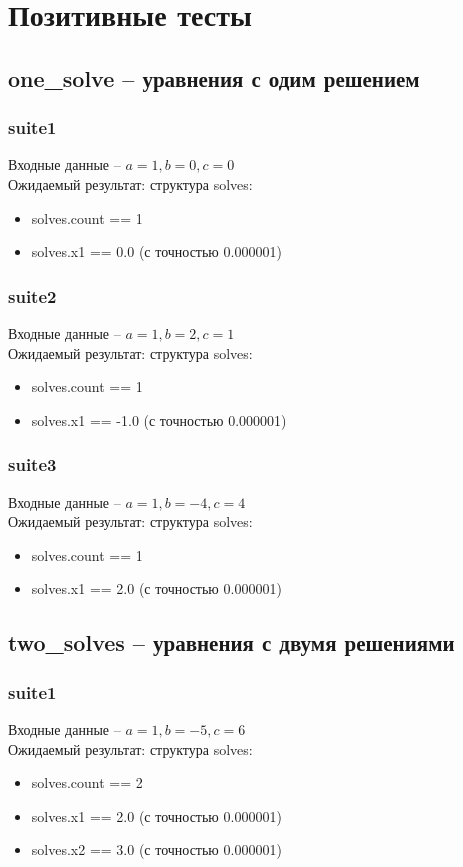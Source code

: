 \documentclass{article}
\begin{document}
\section{Позитивные тесты}
\subsection{one\_solve -- уравнения с одим решением}
\subsubsection{suite1}
Входные данные -- $a=1, b=0, c=0$\\
Ожидаемый результат: структура solves:
\begin{itemize}
    \item solves.count == 1
    \item solves.x1 == 0.0 (с точностью 0.000001)
\end{itemize}
\subsubsection{suite2}
Входные данные -- $a=1, b=2, c=1$\\
Ожидаемый результат: структура solves:
\begin{itemize}
    \item solves.count == 1
    \item solves.x1 == -1.0 (с точностью 0.000001)
\end{itemize}
\subsubsection{suite3}
Входные данные -- $a=1, b=-4, c=4$\\
Ожидаемый результат: структура solves:
\begin{itemize}
    \item solves.count == 1
    \item solves.x1 == 2.0 (с точностью 0.000001)
\end{itemize}

\subsection{two\_solves -- уравнения с двумя решениями}
\subsubsection{suite1}
Входные данные -- $a=1, b=-5, c=6$\\
Ожидаемый результат: структура solves:
\begin{itemize}
    \item solves.count == 2
    \item solves.x1 == 2.0 (с точностью 0.000001)
    \item solves.x2 == 3.0 (с точностью 0.000001)
\end{itemize}
\end{document}
